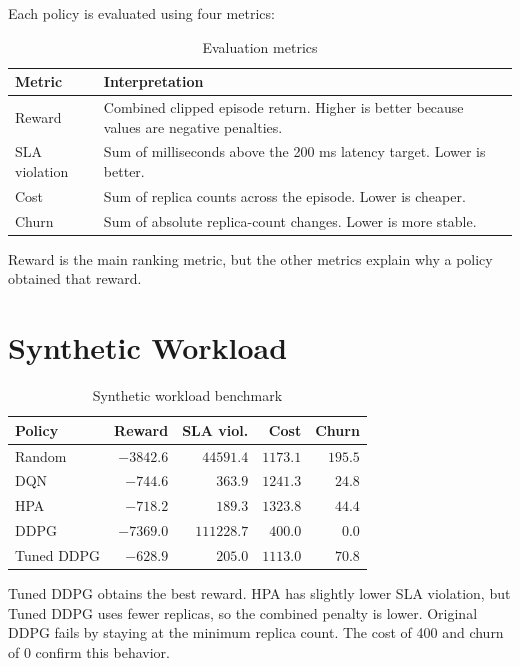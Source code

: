 \documentclass{rapportINPTCLOUD}
\newcommand{\best}[1]{\textbf{#1}}
\begin{document}
Each policy is evaluated using four metrics:

\begin{table}[H]
\centering
\begin{tabularx}{\textwidth}{lY}
\toprule
\textbf{Metric} & \textbf{Interpretation} \\
\midrule
Reward & Combined clipped episode return. Higher is better because values are negative penalties. \\
SLA violation & Sum of milliseconds above the 200 ms latency target. Lower is better. \\
Cost & Sum of replica counts across the episode. Lower is cheaper. \\
Churn & Sum of absolute replica-count changes. Lower is more stable. \\
\bottomrule
\end{tabularx}
\caption{Evaluation metrics}
\end{table}

Reward is the main ranking metric, but the other metrics explain why a policy obtained that reward.

\section{Synthetic Workload}

\begin{table}[H]
\centering
\begin{tabular}{lrrrr}
\toprule
\textbf{Policy} & \textbf{Reward} & \textbf{SLA viol.} & \textbf{Cost} & \textbf{Churn} \\
\midrule
Random & $-3842.6$ & $44591.4$ & $1173.1$ & $195.5$ \\
DQN & $-744.6$ & $363.9$ & $1241.3$ & $24.8$ \\
HPA & $-718.2$ & $189.3$ & $1323.8$ & $44.4$ \\
DDPG & $-7369.0$ & $111228.7$ & $400.0$ & $0.0$ \\
Tuned DDPG & \best{$-628.9$} & $205.0$ & $1113.0$ & $70.8$ \\
\bottomrule
\end{tabular}
\caption{Synthetic workload benchmark}
\label{tab:synthetic}
\end{table}

Tuned DDPG obtains the best reward. HPA has slightly lower SLA violation, but Tuned DDPG uses fewer replicas, so the combined penalty is lower. Original DDPG fails by staying at the minimum replica count. The cost of 400 and churn of 0 confirm this behavior.
\end{document}
